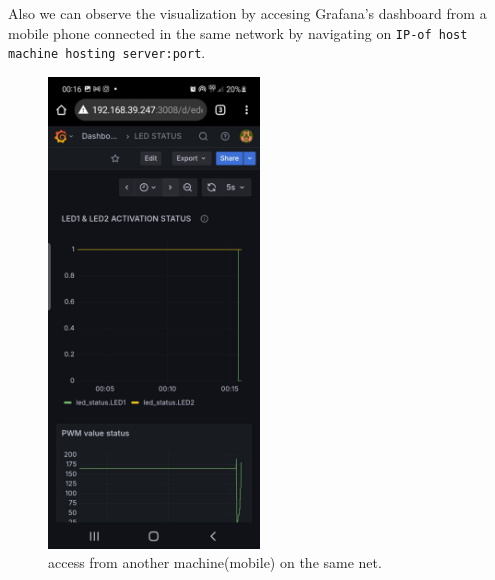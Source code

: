 \documentclass[a4paper,12pt]{article}
\begin{document}
	Also we can observe the visualization by accesing Grafana's dashboard from a mobile phone connected in the same network by navigating
	on \texttt{IP-of host machine hosting server:port}.


		\begin{figure}[H]
			\centering
			\includegraphics[width=0.5\textwidth]{graf3.jpeg}
			\caption{access from another machine(mobile) on the same net.}
			\label{fig1:}
		\end{figure}		
\end{document}
